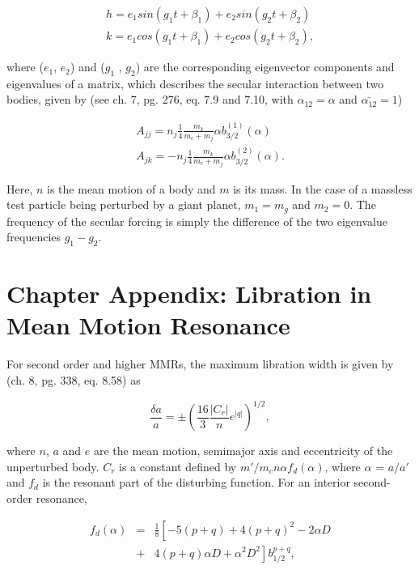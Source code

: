 \begin{eqnarray}\label{eq:kandh}
	h = e_{1} sin (g_{1} t + \beta_{1}) + e_{2} sin (g_{2} t + \beta_{2}) \\ \nonumber
	k = e_{1} cos (g_{1} t + \beta_{1}) + e_{2} cos (g_{2} t + \beta_{2}),
\end{eqnarray}

\noindent where  ($e_{1}$, $e_{2}$) and ($g_{1}$ , $g_{2}$) are the corresponding eigenvector components and eigenvalues of 
a matrix, which describes the secular interaction between two bodies, given by \cite{murray99} (see ch. 7, pg. 276, eq. 7.9 and 
7.10, with $\alpha_{12} = \alpha$ and $\bar{\alpha_{12}} = 1$)

\begin{eqnarray}\label{eq:pert_matrix}
	A_{jj} = n_{j} \frac{1}{4} \frac{m_{k}}{m_{c} + m_{j}} \alpha b_{3/2}^{(1)} (\alpha) \\ \nonumber
	A_{jk} = -n_{j} \frac{1}{4} \frac{m_{k}}{m_{c} + m_{j}} \alpha b_{3/2}^{(2)} (\alpha).
\end{eqnarray}

\noindent Here, $n$ is the mean motion of a body and $m$ is its mass. In the case of a massless test particle being perturbed by 
a giant planet, $m_{1} = m_{g}$ and $m_{2} = 0$. The frequency of the secular forcing is simply the difference of the two 
eigenvalue frequencies $g_{1} - g_{2}$.

\section{Chapter Appendix: Libration in Mean Motion Resonance}\label{sec:libration}

For second order and higher MMRs, the maximum libration width is given by \cite{murray99} (ch. 8, pg. 338, eq. 8.58) as

\begin{equation}\label{eq:res_so}
	\frac{\delta a}{a} = \pm \left( \frac{16}{3} \frac{\left| C_{r} \right|}{n} e^{\left| q \right|} \right)^{1/2},
\end{equation}

\noindent where $n$, $a$ and $e$ are the mean motion, semimajor axis and eccentricity of the unperturbed body. $C_{r}$ is a 
constant defined by $m'/m_{c} n \alpha f_{d}(\alpha)$, where $\alpha$ = $a/a'$ and $f_{d}$ is the resonant part of the disturbing 
function. For an interior second-order resonance,

\begin{eqnarray}\label{eq:fd_so}
	f_{d} (\alpha) &=& \frac{1}{8} \left[ -5(p+q) + 4(p+q)^{2} - 2 \alpha D \right. \\ \nonumber
	                      & + & \left. 4(p+q) \alpha D + \alpha^{2} D^{2} \right] b^{p+q}_{1/2},
\end{eqnarray}

